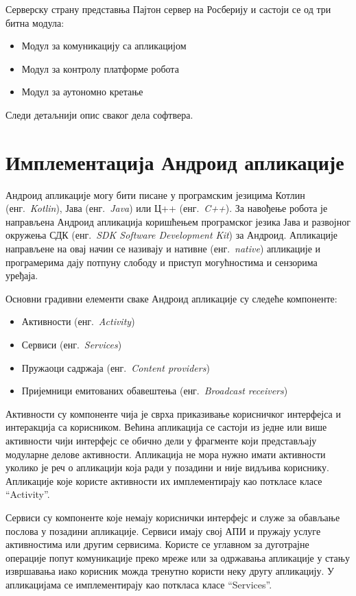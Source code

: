 \documentclass[12pt,oneside]{memoir}
\theoremstyle{remark}
\begin{document}
Серверску страну представња Пајтон сервер на Росберију и састоји се од три битна модула:
\begin{itemize}
\item Модул за комуникацију са апликацијом
\item Модул за контролу платформе робота
\item Модул за аутономно кретање
\end{itemize}

Следи детаљнији опис сваког дела софтвера.

\section{Имплементација Андроид апликације}
Андроид апликације могу бити писане у програмским језицима Котлин (енг.~{\em Kotlin}), Јава (енг.~{\em Java}) или Ц++ (енг.~{\em C++}). За навођење робота је направљена Андроид апликација коришћењем програмског језика Јава и развојног окружења СДК (енг.~{\em SDK Software Development Kit}) за Андроид. Апликације направљене на овај начин се називају и нативне (енг.~{\em native}) апликације и програмерима дају потпуну слободу и приступ могућностима и сензорима уређаја. 

Основни градивни елементи сваке Андроид апликације су следеће компоненте:
\begin{itemize}
\item Активности  (енг.~{\em Activity})
\item Сервиси (енг.~{\em Services})
\item Пружаоци садржаја (енг.~{\em Content providers})
\item Пријемници емитованих обавештења (енг.~{\em Broadcast receivers})
\end{itemize}

Активности су компоненте чија је сврха приказивање корисничког интерфејса и интеракција са корисником. Већина апликација се састоји из једне или више активности чији интерфејс се обично дели у фрагменте који представљају модуларне делове активности. Апликација не мора нужно имати активности уколико је реч о апликацији која ради у позадини и није видљива кориснику. Апликације које користе активности их имплементирају као поткласе класе ``Activity''.

Сервиси су компоненте које немају кориснички интерфејс и служе за обављање послова у позадини апликације. Сервиси имају свој АПИ и пружају услуге активностима или другим сервисима. Користе се углавном за дуготрајне операције попут комуникације преко мреже или за одржавања апликације у стању извршавања иако корисник можда тренутно користи неку другу апликацију. У апликацијама се имплементирају као поткласа класе ``Services''.
\end{document}
